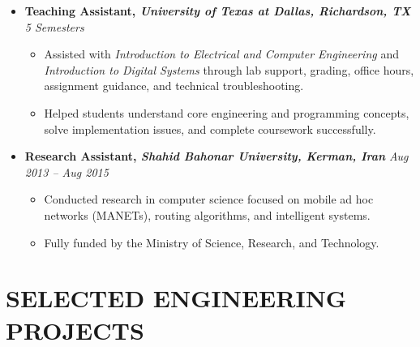 \documentclass[10pt,a4paper,sans]{moderncv}
\begin{document}
\begin{itemize}[leftmargin=0.0 cm, label={}]
\begin{itemize}[leftmargin=0.6cm, label={\textbullet}]
        \item Developed AI systems for sports analytics, including posture classification, kinematic analysis, and athlete performance evaluation.
        
        \item Conducted research in low-light object detection, MRI radiogenomics, and cloud-based AI deployment using AWS.
    \end{itemize}

    \item \textbf{Teaching Assistant, \textit{University of Texas at Dallas, Richardson, TX}} \hfill \textit{5 Semesters}
    \begin{itemize}[leftmargin=0.6cm, label={\textbullet}]
        \item Assisted with \textit{Introduction to Electrical and Computer Engineering} and \textit{Introduction to Digital Systems} through lab support, grading, office hours, assignment guidance, and technical troubleshooting.
        \item Helped students understand core engineering and programming concepts, solve implementation issues, and complete coursework successfully.
    \end{itemize}
   
    \item \textbf{Research Assistant, \textit{Shahid Bahonar University, Kerman, Iran}} \hfill \textit{Aug 2013 -- Aug 2015}
    \begin{itemize}[leftmargin=0.6cm, label={\textbullet}]
        \item Conducted research in computer science focused on mobile ad hoc networks (MANETs), routing algorithms, and intelligent systems.
        \item Fully funded by the Ministry of Science, Research, and Technology.
    \end{itemize}
\end{itemize}

\vspace*{-3mm}

\section{SELECTED ENGINEERING PROJECTS}
\end{document}
